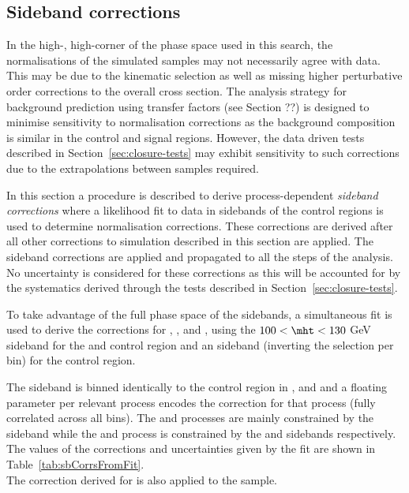 \subsection{Sideband corrections}
\label{sec:sideband-corrections}

In the high-\scalht, high-\etmiss corner of the phase space used in this search, the normalisations 
of the simulated samples may not necessarily agree with data. This may be due
to the kinematic selection as well as missing higher perturbative order corrections 
to the overall cross section. The analysis strategy for background prediction
using transfer factors (see Section ??) is designed to minimise sensitivity 
to normalisation corrections as the background composition is similar
in the control and signal regions. However, the data driven tests 
described in Section~\ref{sec:closure-tests} may exhibit sensitivity to such corrections
due to the extrapolations between samples required.

In this section a procedure is described to derive process-dependent \emph{sideband corrections}
where a likelihood fit to data in sidebands of the control regions is used to determine
normalisation corrections. These corrections are derived after all other corrections to simulation
described in this section are applied. The sideband corrections are applied and propagated 
to all the steps of the analysis. No uncertainty is considered for these corrections as this will
be accounted for by the systematics derived through the tests described in Section~\ref{sec:closure-tests}.

To take advantage of the full phase space of the sidebands, a simultaneous 
fit is used to derive the corrections for \gj, \wj, \zj and \ttbar, using the $100<\mht<130$ GeV sideband
for the \mj and \mmj control region and an \alphat sideband (inverting the \alphat selection per \scalht bin)
for the \gj control region. 

The sideband is binned identically to the control region in \njet, \nb and \scalht and a floating 
parameter per relevant process encodes the correction for that process (fully correlated across all bins).
The \wj and \ttbar processes are mainly constrained by the \mj sideband while the \zj and \gj process is 
constrained by the \mmj and \gj sidebands respectively. The values of the corrections and uncertainties
given by the fit are shown in Table~\ref{tab:sbCorrsFromFit}.\\
The correction derived for \zj is also applied to the \znunu sample. 

